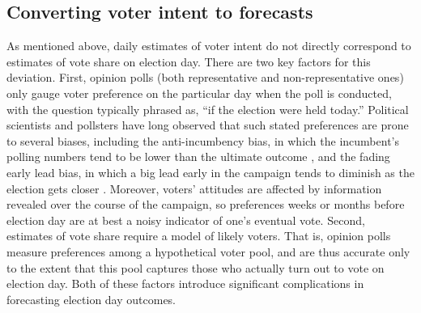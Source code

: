 \documentclass[preprint,authoryear,12pt]{elsarticle}
\begin{document}
\subsection{Converting voter intent to forecasts}
As mentioned above, daily estimates of voter intent do not directly correspond to
estimates of vote share on election day. There are two key factors for
this deviation. First, opinion polls (both representative and non-representative ones)
only gauge voter preference on the particular day
when the poll is conducted, with the question typically phrased as, ``if the election were held today.''
Political scientists and pollsters have long observed that such stated preferences are prone to several biases,
including the anti-incumbency bias, in which the incumbent's polling numbers tend to
be lower than the ultimate outcome \citep{campbell2008american}, and the fading early lead bias, in which a
big lead early in the campaign tends to diminish as the election gets closer \citep{erikson2008political}. Moreover,
voters' attitudes are affected by information revealed over the course of the campaign, so preferences
weeks or months before election day are at best a noisy indicator of one's eventual vote.
Second, estimates of vote share require a model of likely voters. That is, opinion polls
measure preferences among a hypothetical voter pool, and are thus accurate only to the extent that
this pool captures those who actually turn out to vote on election day.
Both of these factors introduce significant complications in forecasting election day outcomes.
\end{document}
